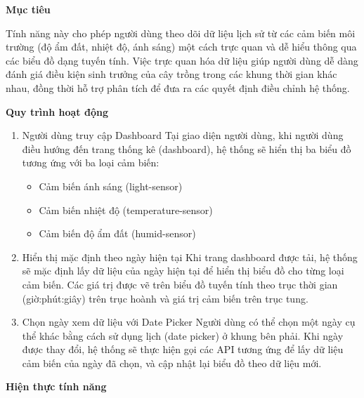 \textbf{Mục tiêu}

Tính năng này cho phép người dùng theo dõi dữ liệu lịch sử từ các cảm biến môi trường (độ ẩm đất, nhiệt độ, ánh sáng) một cách trực quan và dễ hiểu thông qua các biểu đồ dạng tuyến tính. Việc trực quan hóa dữ liệu giúp người dùng dễ dàng đánh giá điều kiện sinh trưởng của cây trồng trong các khung thời gian khác nhau, đồng thời hỗ trợ phân tích để đưa ra các quyết định điều chỉnh hệ thống.

\textbf{Quy trình hoạt động}
\begin{enumerate}
    \item Người dùng truy cập Dashboard \newline
    Tại giao diện người dùng, khi người dùng điều hướng đến trang thống kê (dashboard), hệ thống sẽ hiển thị ba biểu đồ tương ứng với ba loại cảm biến:
    \begin{itemize}
        \item Cảm biến ánh sáng (light-sensor)
        \item Cảm biến nhiệt độ (temperature-sensor)
        \item Cảm biến độ ẩm đất (humid-sensor)
    \end{itemize}

    \item Hiển thị mặc định theo ngày hiện tại \newline
    Khi trang dashboard được tải, hệ thống sẽ mặc định lấy dữ liệu của ngày hiện tại để hiển thị biểu đồ cho từng loại cảm biến. Các giá trị được vẽ trên biểu đồ tuyến tính theo trục thời gian (giờ:phút:giây) trên trục hoành và giá trị cảm biến trên trục tung.
    
    \item Chọn ngày xem dữ liệu với Date Picker \newline
    Người dùng có thể chọn một ngày cụ thể khác bằng cách sử dụng lịch (date picker) ở khung bên phải. Khi ngày được thay đổi, hệ thống sẽ thực hiện gọi các API tương ứng để lấy dữ liệu cảm biến của ngày đã chọn, và cập nhật lại biểu đồ theo dữ liệu mới.
\end{enumerate}
    
\textbf{Hiện thực tính năng}

